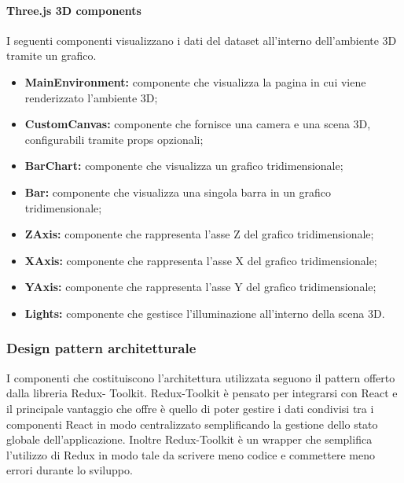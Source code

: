 \paragraph{Three.js 3D components}
    I seguenti componenti visualizzano i dati del dataset all'interno dell'ambiente 3D tramite un grafico.
    \begin{itemize}
        \item \textbf{MainEnvironment:} componente che visualizza la pagina in cui viene renderizzato l'ambiente 3D;
        \item \textbf{CustomCanvas:} componente che fornisce una camera e una scena 3D, configurabili tramite props opzionali;
        \item \textbf{BarChart:} componente che visualizza un grafico tridimensionale;
        \item \textbf{Bar:} componente che visualizza una singola barra in un grafico tridimensionale;
        \item \textbf{ZAxis:} componente che rappresenta l'asse Z del grafico tridimensionale;
        \item \textbf{XAxis:} componente che rappresenta l'asse X del grafico tridimensionale;
        \item \textbf{YAxis:} componente che rappresenta l'asse Y del grafico tridimensionale;
        \item \textbf{Lights:} componente che gestisce l'illuminazione all'interno della scena 3D.
    \end{itemize}

\subsubsection{Design pattern architetturale}
I componenti che costituiscono l’architettura utilizzata seguono il pattern offerto dalla libreria Redux-
Toolkit.
Redux-Toolkit è pensato per integrarsi con React e il principale vantaggio che offre è quello di poter
gestire i dati condivisi tra i componenti React in modo centralizzato semplificando la gestione dello stato
globale dell’applicazione.
Inoltre Redux-Toolkit è un wrapper che semplifica l'utilizzo di Redux in modo tale da scrivere meno codice e commettere meno errori durante lo sviluppo.

